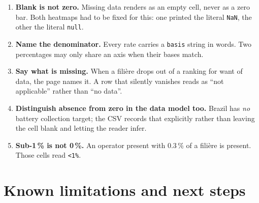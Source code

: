 \documentclass[11pt,a4paper]{article}
\newcommand{\file}[1]{\texttt{#1}}
\begin{document}
\begin{enumerate}
  \item \textbf{Blank is not zero.} Missing data renders as an empty cell, never
        as a zero bar. Both heatmaps had to be fixed for this: one printed the
        literal \file{NaN}, the other the literal \file{null}.
  \item \textbf{Name the denominator.} Every rate carries a \file{basis} string
        in words. Two percentages may only share an axis when their bases match.
  \item \textbf{Say what is missing.} When a filière drops out of a ranking for
        want of data, the page names it. A row that silently vanishes reads as
        ``not applicable'' rather than ``no data''.
  \item \textbf{Distinguish absence from zero in the data model too.} Brazil has
        \emph{no} battery collection target; the CSV records that explicitly
        rather than leaving the cell blank and letting the reader infer.
  \item \textbf{Sub-1\,\% is not 0\,\%.} An operator present with 0.3\,\% of a
        filière is present. Those cells read \file{<1\%}.
\end{enumerate}

\section{Known limitations and next steps}
\end{document}
